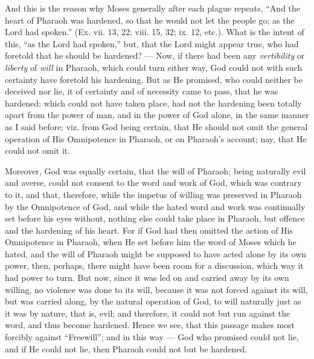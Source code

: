 And this is the reason why Moses generally after each plague repeats, “And the heart of Pharaoh was hardened, so that he would not let the people go; as the Lord had spoken.” (Ex. vii. 13, 22; viii. 15, 32; ix. 12, etc.). What is the intent of this, “as the Lord had spoken,” but, that the Lord might appear true, who had foretold that he should be hardened? — Now, if there had been any \emph{vertibility }or \emph{liberty }of \emph{will }in Pharaoh, which could turn either way, God could not with such certainty have foretold his hardening. But as He promised, who could neither be deceived nor lie, it of certainty and of necessity came to pass, that he was hardened: which could not have taken place, had not the hardening been totally apart from the power of man, and in the power of God alone, in the same manner as I said before; viz. from God being certain, that He should not omit the general operation of His Omnipotence in Pharaoh, or on Pharaoh’s account; nay, that He could not omit it.

Moreover, God was equally certain, that the will of Pharaoh; being naturally evil and averse, could not consent to the word and work of God, which was contrary to it, and that, therefore, while the impetus of willing was preserved in Pharaoh by the Omnipotence of God, and while the hated word and work was continually set before his eyes without, nothing else could take place in Pharaoh, but offence and the hardening of his heart. For if God had then omitted the action of His Omnipotence in Pharaoh, when He set before him the word of Moses which he hated, and the will of Pharaoh might be supposed to have acted alone by its own power, then, perhaps, there might have been room for a discussion, which way it had power to turn. But now, since it was led on and carried away by its own willing, no violence was done to its will, because it was not forced against its will, but was carried along, by the natural operation of God, to will naturally just as it was by nature, that is, evil; and therefore, it could not but run against the word, and thus become hardened. Hence we see, that this passage makes most forcibly against “Freewill”; and in this way — God who promised could not lie, and if He could not lie, then Pharaoh could not but be hardened.


